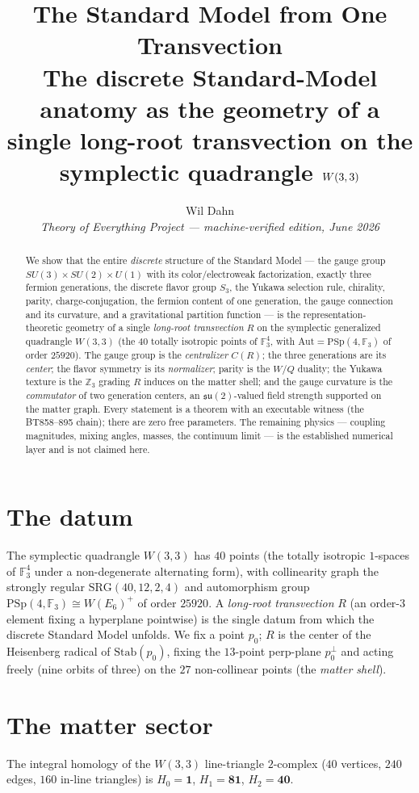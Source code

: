 \documentclass[11pt]{article}
\title{\textbf{The Standard Model from One Transvection}\\[4pt]
\large The discrete Standard-Model anatomy as the geometry of a single
long-root transvection on the symplectic quadrangle $\W$}
\author{Wil Dahn\\[2pt]
\normalsize\textit{Theory of Everything Project --- machine-verified
edition, June 2026}}
\date{}
\newcommand{\W}{W(3,3)}
\newcommand{\GF}[1]{\mathbb{F}_{#1}}
\newcommand{\PSp}{\mathrm{PSp}}
\newcommand{\Z}{\mathbb{Z}}
\begin{document}
\maketitle

\begin{abstract}
We show that the entire \emph{discrete} structure of the Standard Model
--- the gauge group $SU(3)\times SU(2)\times U(1)$ with its
color/electroweak factorization, exactly three fermion generations, the
discrete flavor group $S_3$, the Yukawa selection rule, chirality,
parity, charge-conjugation, the fermion content of one generation, the
gauge connection and its curvature, and a gravitational partition
function --- is the representation-theoretic geometry of a single
\emph{long-root transvection} $R$ on the symplectic generalized
quadrangle $\W$ (the $40$ totally isotropic points of $\GF3^4$, with
$\mathrm{Aut}=\PSp(4,\GF3)$ of order $25920$). The gauge group is the
\emph{centralizer} $C(R)$; the three generations are its \emph{center};
the flavor symmetry is its \emph{normalizer}; parity is the $W/Q$
duality; the Yukawa texture is the $\Z_3$ grading $R$ induces on the
matter shell; and the gauge curvature is the \emph{commutator} of two
generation centers, an $\mathfrak{su}(2)$-valued field strength
supported on the matter graph. Every statement is a theorem with an
executable witness (the BT858--895 chain); there are zero free
parameters. The remaining physics --- coupling magnitudes, mixing
angles, masses, the continuum limit --- is the established numerical
layer and is not claimed here.
\end{abstract}

\section{The datum}
The symplectic quadrangle $\W$ has $40$ points (the totally isotropic
$1$-spaces of $\GF3^4$ under a non-degenerate alternating form), with
collinearity graph the strongly regular $\mathrm{SRG}(40,12,2,4)$ and
automorphism group $\PSp(4,\GF3)\cong W(E_6)^{+}$ of order $25920$. A
\emph{long-root transvection} $R$ (an order-$3$ element fixing a
hyperplane pointwise) is the single datum from which the discrete
Standard Model unfolds. We fix a point $p_0$; $R$ is the center of the
Heisenberg radical of $\mathrm{Stab}(p_0)$, fixing the $13$-point
perp-plane $p_0^{\perp}$ and acting freely (nine orbits of three) on the
$27$ non-collinear points (the \emph{matter shell}).

\section{The matter sector}
The integral homology of the $\W$ line-triangle $2$-complex
($40$ vertices, $240$ edges, $160$ in-line triangles) is
$H_0=\mathbf 1$, $H_1=\mathbf{81}$, $H_2=\mathbf{40}$.
\end{document}
